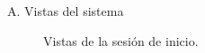 \begin{annexes}{A. Vistas del sistema}
\begin{figure}[!ht]
        \caption{Vistas de la sesión de inicio.}
        \label{annex: 2}
    \end{figure}


\end{annexes}
